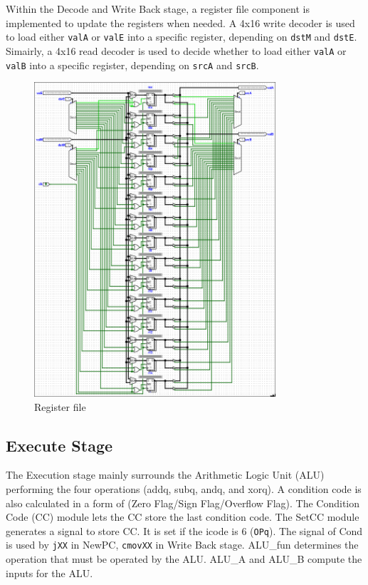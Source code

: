 \documentclass{article}
\begin{document}
Within the Decode and Write Back stage, a register file component is implemented to update the registers when needed. 
A 4x16 write decoder is used to load either \lstinline{valA} or \lstinline{valE} into a specific register, depending on \lstinline{dstM} and \lstinline{dstE}. 
Simairly, a 4x16 read decoder is used to decide whether to load either \lstinline{valA} or \lstinline{valB} into a specific register, depending on \lstinline{srcA} and \lstinline{srcB}.  

\begin{figure}[H]
    \centering
    \includegraphics[width=0.8\textwidth]{./images/register_file.png}
    \caption{Register file}
\end{figure}

\subsection{Execute Stage}

The Execution stage mainly surrounds the Arithmetic Logic Unit (ALU) performing the four operations (addq, subq, andq, and xorq). 
A condition code is also calculated in a form of (Zero Flag/Sign Flag/Overflow Flag). 
The Condition Code (CC) module lets the CC store the last condition code. 
The SetCC module generates a signal to store CC. It is set if the icode is 6 (\lstinline{OPq}). 
The signal of Cond is used by \lstinline{jXX} in NewPC, \lstinline{cmovXX} in Write Back stage. 
ALU\_fun determines the operation that must be operated by the ALU. 
ALU\_A and ALU\_B compute the inputs for the ALU. 
\end{document}
